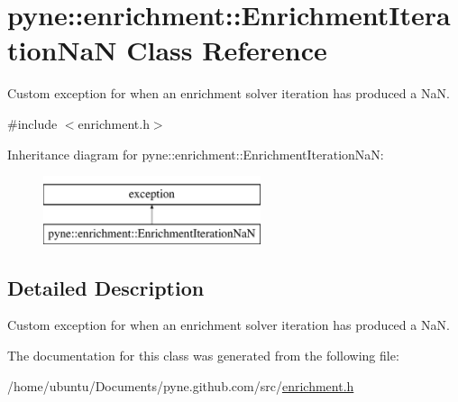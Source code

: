 \hypertarget{classpyne_1_1enrichment_1_1_enrichment_iteration_na_n}{}\section{pyne\+:\+:enrichment\+:\+:Enrichment\+Iteration\+NaN Class Reference}
\label{classpyne_1_1enrichment_1_1_enrichment_iteration_na_n}


Custom exception for when an enrichment solver iteration has produced a NaN.  




{\ttfamily \#include $<$enrichment.\+h$>$}

Inheritance diagram for pyne\+:\+:enrichment\+:\+:Enrichment\+Iteration\+NaN\+:\begin{figure}[H]
\begin{center}
\leavevmode
\includegraphics[height=2.000000cm]{classpyne_1_1enrichment_1_1_enrichment_iteration_na_n}
\end{center}
\end{figure}


\subsection{Detailed Description}
Custom exception for when an enrichment solver iteration has produced a NaN. 

The documentation for this class was generated from the following file\+:\begin{DoxyCompactItemize}
\item 
/home/ubuntu/\+Documents/pyne.\+github.\+com/src/\hyperlink{enrichment_8h}{enrichment.\+h}\end{DoxyCompactItemize}

